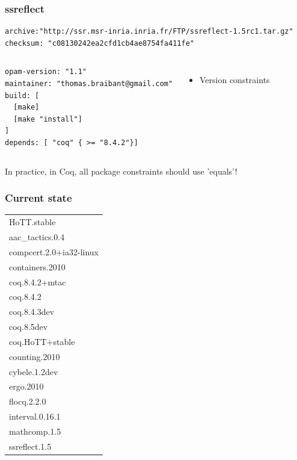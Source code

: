 \documentclass[9pt]{beamer}
\begin{document}
\begin{frame}[fragile]
  \frametitle{ssreflect}

\lstset{basicstyle=\footnotesize}

  \begin{lstlisting}
archive:"http://ssr.msr-inria.inria.fr/FTP/ssreflect-1.5rc1.tar.gz"
checksum: "c08130242ea2cfd1cb4ae8754fa411fe"
  \end{lstlisting}
  \begin{columns}
  \begin{lstlisting}
opam-version: "1.1" 
maintainer: "thomas.braibant@gmail.com"
build: [
  [make]
  [make "install"]
]
depends: [ "coq" { >= "8.4.2"}]
  \end{lstlisting}
    \begin{itemize}
      \item Version constraints
    \end{itemize}
  \end{columns}
\pause
\begin{center}
  In practice, in Coq, all package constraints should use 'equals'!
\end{center}
\end{frame}

\begin{frame}
  \frametitle{Current state}
  \begin{center}
    \begin{tabular}{l}
      HoTT.stable	\\
      aac\_tactics.0.4	 \\
      compcert.2.0+ia32-linux \\
      containers.2010	 \\
      coq.8.4.2+mtac	\\
      coq.8.4.2	\\
      coq.8.4.3dev	\\
      coq.8.5dev	\\
      coq.HoTT+stable	\\
      counting.2010	\\
      cybele.1.2dev	\\
      ergo.2010	        \\
      flocq.2.2.0	\\
      interval.0.16.1	\\
      mathcomp.1.5	\\
      ssreflect.1.5  
    \end{tabular}
  \end{center}
\end{frame}
\end{document}
